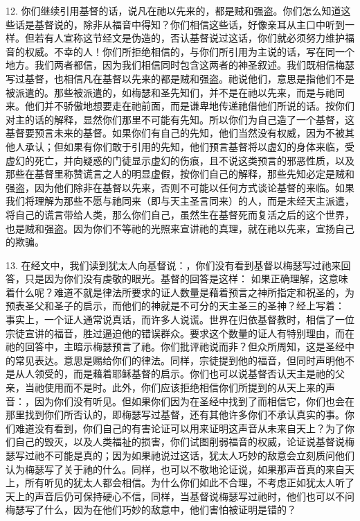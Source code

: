12. 你们继续引用基督的话，说凡在祂以先来的，都是贼和强盗。你们怎么知道这些话是基督说的，除非从福音中得知？你们相信这些话，好像亲耳从主口中听到一样。但若有人宣称这节经文是伪造的，否认基督说过这话，你们就必须努力维护福音的权威。不幸的人！你们所拒绝相信的，与你们所引用为主说的话，写在同一个地方。我们两者都信，因为我们相信同时包含这两者的神圣叙述。我们既相信梅瑟写过基督，也相信凡在基督以先来的都是贼和强盗。祂说他们，意思是指他们不是被派遣的。那些被派遣的，如梅瑟和圣先知们，并不是在祂以先来，而是与祂同来。他们并不骄傲地想要走在祂前面，而是谦卑地传递祂借他们所说的话。按你们对主的话的解释，显然你们那里不可能有先知。所以你们为自己造了一个基督，这基督要预言未来的基督。如果你们有自己的先知，他们当然没有权威，因为不被其他人承认；但如果有你们敢于引用的先知，他们预言基督将以虚幻的身体来临，受虚幻的死亡，并向疑惑的门徒显示虚幻的伤痕，且不说这类预言的邪恶性质，以及那些在基督里称赞谎言之人的明显虚假，按你们自己的解释，那些先知必定是贼和强盗，因为他们除非在基督以先来，否则不可能以任何方式谈论基督的来临。如果我们将理解为那些不愿与祂同来（即与天主圣言同来）的人，而是未经天主派遣，将自己的谎言带给人类，那么你们自己，虽然生在基督死而复活之后的这个世界，也是贼和强盗。因为你们不等祂的光照来宣讲祂的真理，就在祂以先来，宣扬自己的欺骗。\par

13. 在经文中，我们读到犹太人向基督说：，你们没有看到基督以梅瑟写过祂来回答，只是因为你们没有虔敬的眼光。基督的回答是这样： 如果正确理解，这意味着什么呢？难道不就是律法所要求的证人数量是藉着预言之神所指定和祝圣的，为预表圣父和圣子的启示，而他们的神就是不可分的天主圣三的圣神？经上写着： 事实上，一个证人通常说真话，而许多人说谎。世界在归依基督教时，相信了一位宗徒宣讲的福音，胜过逼迫他的错误群众。要求这个数量的证人有特别理由，而在祂的回答中，主暗示梅瑟预言了祂。你们批评祂说而非？但众所周知，这是圣经中的常见表达。意思是赐给你们的律法。同样，宗徒提到他的福音，但同时声明他不是从人领受的，而是藉着耶稣基督的启示。你们也可以说基督否认天主是祂的父亲，当祂使用而不是时。此外，你们应该拒绝相信你们所提到的从天上来的声音：，因为你们没有听见。但如果你们因为在圣经中找到了而相信它，你们也会在那里找到你们所否认的，即梅瑟写过基督，还有其他许多你们不承认真实的事。你们难道没有看到，你们自己的有害论证可以用来证明这声音从未来自天上？为了你们自己的毁灭，以及人类福祉的损害，你们试图削弱福音的权威，论证说基督说梅瑟写过祂不可能是真的；因为如果祂说过这话，犹太人巧妙的敌意会立刻质问他们认为梅瑟写了关于祂的什么。同样，也可以不敬地论证说，如果那声音真的来自天上，所有听见的犹太人都会相信。为什么你们如此不合理，不考虑正如犹太人听了天上的声音后仍可保持硬心不信，同样，当基督说梅瑟写过祂时，他们也可以不问梅瑟写了什么，因为在他们巧妙的敌意中，他们害怕被证明是错的？\par

